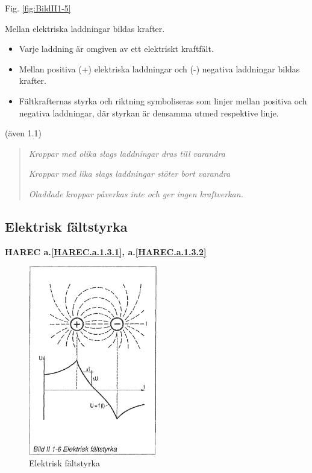 Fig. \ref{fig:BildII1-5}

Mellan elektriska laddningar bildas krafter.

\begin{itemize}
\item Varje laddning är omgiven av ett elektriskt kraftfält.
\item Mellan positiva (+) elektriska laddningar
och (-) negativa laddningar bildas krafter.
\item Fältkrafternas styrka och riktning symboliseras som linjer mellan positiva och
negativa laddningar, där styrkan är densamma utmed respektive linje.
\end{itemize}

(även 1.1)

\begin{quote}
\emph{Kroppar med olika slags laddningar dras till varandra}

\emph{Kroppar med lika slags laddningar stöter bort varandra}

\emph{Oladdade kroppar påverkas inte och ger ingen kraftverkan.}
\end{quote}

\subsection{Elektrisk fältstyrka}
\textbf{HAREC a.\ref{HAREC.a.1.3.1}, a.\ref{HAREC.a.1.3.2}\label{myHAREC.a.1.3.1}\label{myHAREC.a.1.3.2}}

\begin{figure}
  \includegraphics[width=0.5\textwidth]{images/bild_2_1-06}
  \caption{Elektrisk fältstyrka}
  \label{fig:BildII1-6}
\end{figure}


